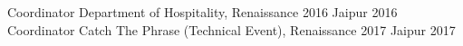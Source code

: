 \begin{cvhonors}
  \cvhonor
    {Coordinator}
    {Department of Hospitality, Renaissance 2016}
    {Jaipur}
    {2016}
  \cvhonor
    {Coordinator}
    {Catch The Phrase (Technical Event), Renaissance 2017}
    {Jaipur}
    {2017}
\end{cvhonors}
